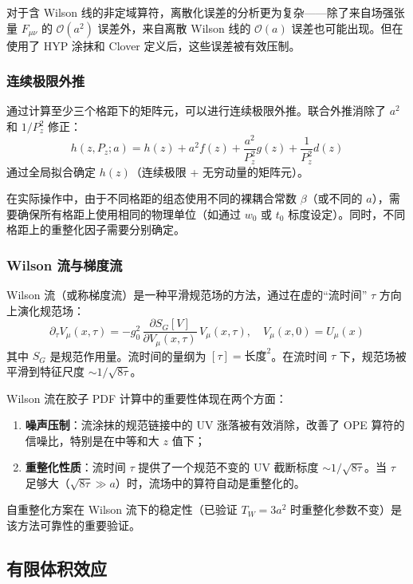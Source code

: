 \documentclass[11pt,a4paper]{ctexart}
\newcommand{\order}[1]{\mathcal{O}(#1)}
\begin{document}
对于含 Wilson 线的非定域算符，离散化误差的分析更为复杂——除了来自场强张量 $F_{\mu\nu}$ 的 $\order{a^2}$ 误差外，来自离散 Wilson 线的 $\order{a}$ 误差也可能出现。但在使用了 HYP 涂抹和 Clover 定义后，这些误差被有效压制。

\subsubsection{连续极限外推}

通过计算至少三个格距下的矩阵元，可以进行连续极限外推。联合外推消除了 $a^2$ 和 $1/P_z^2$ 修正：
\begin{equation}
h(z, P_z; a) = h(z) + a^2 f(z) + \frac{a^2}{P_z^2} g(z) + \frac{1}{P_z^2} d(z)
\end{equation}
通过全局拟合确定 $h(z)$（连续极限 + 无穷动量的矩阵元）。

在实际操作中，由于不同格距的组态使用不同的裸耦合常数 $\beta$（或不同的 $a$），需要确保所有格距上使用相同的物理单位（如通过 $w_0$ 或 $t_0$ 标度设定）。同时，不同格距上的重整化因子需要分别确定。

\subsubsection{Wilson 流与梯度流}

Wilson 流（或称梯度流）是一种平滑规范场的方法，通过在虚的``流时间'' $\tau$ 方向上演化规范场：
\begin{equation}
\partial_\tau V_\mu(x,\tau) = -g_0^2 \, \frac{\partial S_G[V]}{\partial V_\mu(x,\tau)} \, V_\mu(x,\tau), \quad V_\mu(x,0) = U_\mu(x)
\end{equation}
其中 $S_G$ 是规范作用量。流时间的量纲为 $[\tau] = \text{长度}^2$。在流时间 $\tau$ 下，规范场被平滑到特征尺度 $\sim 1/\sqrt{8\tau}$。

Wilson 流在胶子 PDF 计算中的重要性体现在两个方面：
\begin{enumerate}
  \item \textbf{噪声压制}：流涂抹的规范链接中的 UV 涨落被有效消除，改善了 OPE 算符的信噪比，特别是在中等和大 $z$ 值下；
  \item \textbf{重整化性质}：流时间 $\tau$ 提供了一个规范不变的 UV 截断标度 $\sim 1/\sqrt{8\tau}$。当 $\tau$ 足够大（$ \sqrt{8\tau} \gg a$）时，流场中的算符自动是重整化的。
\end{enumerate}

自重整化方案在 Wilson 流下的稳定性（已验证 $T_W = 3a^2$ 时重整化参数不变）是该方法可靠性的重要验证。

\subsection{有限体积效应}
\end{document}
